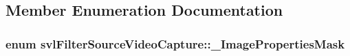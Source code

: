 \subsection{Member Enumeration Documentation}
\hypertarget{classsvl_filter_source_video_capture_a479413536f6b6d984c08c44b0cbd64f2}{
\subsubsection[{\-\_\-\-Image\-Properties\-Mask}]{\setlength{\rightskip}{0pt plus 5cm}enum {\bf svl\-Filter\-Source\-Video\-Capture\-::\-\_\-\-Image\-Properties\-Mask}}}\label{classsvl_filter_source_video_capture_a479413536f6b6d984c08c44b0cbd64f2}
